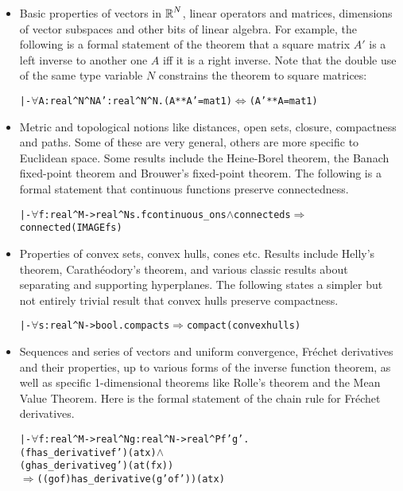 \documentclass[11pt]{amsart}
\def\sz{small} %
\newcommand{\real}{\mbox{$\protect\mathbb R$}}
\let\And=\wedge                    %
\newcommand{\Imp}{\Rightarrow}
\newcommand{\Iff}{\Leftrightarrow}
\begin{document}
\begin{itemize}

\item Basic properties of vectors in $\real^N$, linear operators and matrices,
dimensions of vector subspaces and other bits of linear algebra. For example,
the following is a formal statement of the theorem that a square matrix $A'$ is
a left inverse to another one $A$ iff it is a right inverse. Note that the
double use of the same type variable $N$ constrains the theorem to square
matrices:

\begin{\sz}\begin{alltt}
|- \(\forall\)A:real^N^N A':real^N^N. (A ** A' = mat 1) \(\Iff\) (A' ** A = mat 1)
\end{alltt}\end{\sz}

\item Metric and topological notions like distances, open sets, closure,
compactness and paths. Some of these are very general, others are more specific
to Euclidean space. Some results include the Heine-Borel theorem, the Banach
fixed-point theorem and Brouwer's fixed-point theorem. The following is a
formal statement that continuous functions preserve connectedness.

\begin{\sz}\begin{alltt}
|-  \(\forall\)f:real^M->real^N s. f continuous_on s \(\And\) connected s \(\Imp\) connected(IMAGE f s)
\end{alltt}\end{\sz}

\item Properties of convex sets, convex hulls, cones etc. Results include
Helly's theorem, Carath\'eodory's theorem, and various classic results about
separating and supporting hyperplanes. The following states a simpler but not
entirely trivial result that convex hulls preserve compactness.

\begin{\sz}\begin{alltt}
|- \(\forall\)s:real^N->bool. compact s \(\Imp\) compact(convex hull s)
\end{alltt}\end{\sz}

\item Sequences and series of vectors and uniform convergence, Fr\'echet
derivatives and their properties, up to various forms of the inverse function
theorem, as well as specific 1-dimensional theorems like Rolle's theorem and
the Mean Value Theorem. Here is the formal statement of the chain rule for
Fr\'echet derivatives.

\begin{\sz}\begin{alltt}
|- \(\forall\)f:real^M->real^N g:real^N->real^P f' g'.
        (f has_derivative f') (at x) \(\And\)
        (g has_derivative g') (at (f x))
        \(\Imp\) ((g o f) has_derivative (g' o f')) (at x)
\end{alltt}\end{\sz}

\end{itemize}
\end{document}
